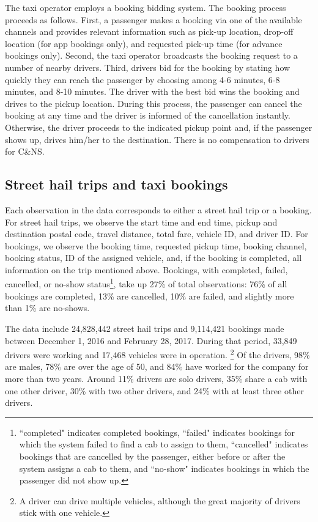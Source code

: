 \documentclass[reviewmode,AEJ]{AEA}
\begin{document}
The taxi operator employs a booking bidding system. The booking process proceeds as follows. 
First, a passenger makes a booking via one of the available channels and provides relevant information 
such as pick-up location, drop-off location (for app bookings only), and requested pick-up time 
(for advance bookings only). Second, the taxi operator broadcasts the booking request to a number of 
nearby drivers. Third, drivers bid for the booking by stating how quickly they can reach the passenger 
by choosing among 4-6 minutes, 6-8 minutes, and 8-10 minutes. The driver with the best bid wins the
booking and drives to the pickup location. During this process, the passenger can cancel the booking
at any time and the driver is informed of the cancellation instantly. Otherwise, the driver proceeds
to the indicated pickup point and, if the passenger shows up, drives him/her to the destination. 
There is no compensation to drivers for C\&NS.

\subsection{Street hail trips and taxi bookings}
Each observation in the data corresponds to either a street hail trip or a booking. For street hail trips, 
we observe the start time and end time, pickup and destination postal code, 
travel distance, total fare, vehicle ID, and driver ID. For bookings, we observe the booking time, 
requested pickup time, booking channel, booking status,  ID of the assigned vehicle, and, if the booking
is completed, all information on the trip mentioned above. Bookings, with completed, failed, cancelled, 
or no-show status\footnote{``completed" indicates completed bookings, ``failed" indicates bookings for
which the system failed to find a cab to assign to them, ``cancelled" indicates bookings that are cancelled
by the passenger, either before or after the system assigns a cab to them, and ``no-show" indicates bookings 
in which the passenger did not show up.}, take up 27\% of  total observations: 76\% of all bookings are 
completed, 13\% are cancelled, 10\% are failed, and slightly more than 1\% are no-shows.

The data include 24,828,442 street hail trips and 9,114,421 bookings made between December 1, 2016 and
February 28, 2017. During that period, 33,849 drivers were working and 17,468 vehicles were in operation.%
\footnote{A driver can drive multiple vehicles, although the great majority of drivers stick with one vehicle.} 
Of the drivers, 98\% are males, 78\% are over the age of 50, and 84\% have worked for the company for more than
two years. Around 11\% drivers are solo drivers, 35\% share a cab with one other driver, 30\% with two other 
drivers, and 24\% with at least three other drivers.
\end{document}
